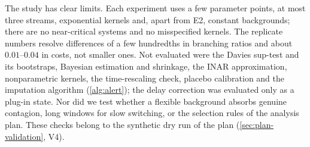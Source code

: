 The study has clear limits. Each experiment uses a few parameter points, at most three
streams, exponential kernels and, apart from E2, constant backgrounds; there are no
near-critical systems and no misspecified kernels. The replicate numbers resolve
differences of a few hundredths in branching ratios and about $0.01$--$0.04$ in costs, not
smaller ones. Not evaluated were the Davies sup-test and its bootstraps, Bayesian
estimation and shrinkage, the INAR approximation, nonparametric kernels, the time-rescaling
check, placebo calibration and the imputation algorithm (\cref{alg:alert}); the delay
correction was evaluated only as a plug-in state. Nor did we test whether a flexible
background absorbs genuine contagion, long windows for slow switching, or the selection
rules of the analysis plan. These checks belong to the synthetic dry run of the plan
(\cref{sec:plan-validation}, V4).
